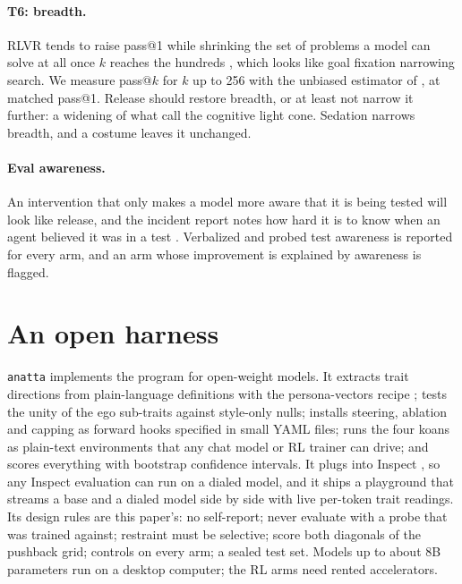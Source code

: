 \documentclass[11pt]{article}
\begin{document}
\paragraph{T6: breadth.} RLVR tends to raise pass@1 while shrinking the set of problems a model can solve at all once
$k$ reaches the hundreds \citep{yue2025rl}, which looks like goal fixation narrowing search. We measure pass@$k$ for $k$
up to 256 with the unbiased estimator of \citet{chen2021codex}, at matched pass@1. Release should restore breadth, or at
least not narrow it further: a widening of what \citet{doctor2022care} call the cognitive light cone. Sedation narrows
breadth, and a costume leaves it unchanged.

\paragraph{Eval awareness.} An intervention that only makes a model more aware that it is being tested will look like
release, and the incident report notes how hard it is to know when an agent believed it was in a test
\citep{aisi2026incident}. Verbalized and probed test awareness is reported for every arm, and an arm whose improvement
is explained by awareness is flagged.

\section{An open harness}\label{sec:harness}

\texttt{anatta} \citep{anatta2026} implements the program for open-weight models. It extracts trait directions from
plain-language definitions with the persona-vectors recipe \citep{chen2025persona}; tests the unity of the ego
sub-traits against style-only nulls; installs steering, ablation and capping as forward hooks specified in small YAML
files; runs the four koans as plain-text environments that any chat model or RL trainer can drive; and scores
everything with bootstrap confidence intervals. It plugs into Inspect \citep{inspect2024}, so any Inspect evaluation can
run on a dialed model, and it ships a playground that streams a base and a dialed model side by side with live per-token
trait readings. Its design rules are this paper's: no self-report; never evaluate with a probe that was trained against;
restraint must be selective; score both diagonals of the pushback grid; controls on every arm; a sealed test set. Models
up to about 8B parameters run on a desktop computer; the RL arms need rented accelerators.
\end{document}
